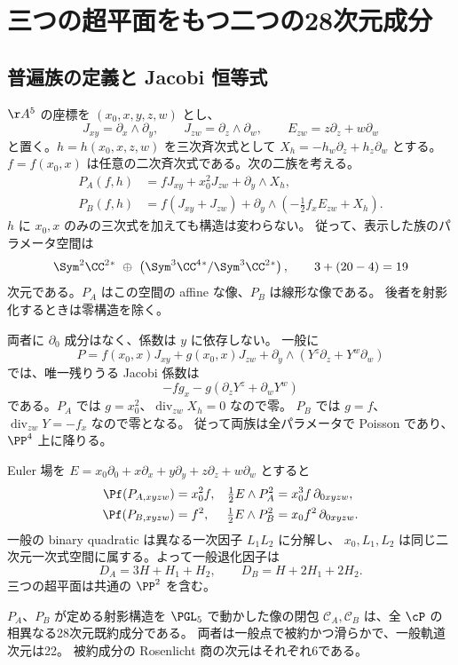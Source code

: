 \section{三つの超平面をもつ二つの28次元成分}\label{sec:ambient}
\subsection{普遍族の定義と Jacobi 恒等式}
$\AA^5$ の座標を $(x_0,x,y,z,w)$ とし、
\[
 J_{xy}=\partial_x\wedge\partial_y,\qquad
 J_{zw}=\partial_z\wedge\partial_w,\qquad
 E_{zw}=z\partial_z+w\partial_w
\]
と置く。$h=h(x_0,x,z,w)$ を三次斉次式として
$X_h=-h_w\partial_z+h_z\partial_w$ とする。
$f=f(x_0,x)$ は任意の二次斉次式である。次の二族を考える。
\begin{align}
 P_A(f,h)&=fJ_{xy}+x_0^2J_{zw}+\partial_y\wedge X_h,
 \label{eq:PA}\\
 P_B(f,h)&=f(J_{xy}+J_{zw})
       +\partial_y\wedge\left(-\frac12f_xE_{zw}+X_h\right).
 \label{eq:PB}
\end{align}
$h$ に $x_0,x$ のみの三次式を加えても構造は変わらない。
従って、表示した族のパラメータ空間は
\[
 \Sym^2\CC^2{}^*\ \oplus\
 \left(\Sym^3\CC^4{}^*/\Sym^3\CC^2{}^*\right),
 \qquad 3+(20-4)=19
\]
次元である。$P_A$ はこの空間の affine な像、$P_B$ は線形な像である。
後者を射影化するときは零構造を除く。

両者に $\partial_0$ 成分はなく、係数は $y$ に依存しない。
一般に
\[
 P=f(x_0,x)J_{xy}+g(x_0,x)J_{zw}
                 +\partial_y\wedge(Y^z\partial_z+Y^w\partial_w)
\]
では、唯一残りうる Jacobi 係数は
\[
             -f g_x-g(\partial_zY^z+\partial_wY^w)
\]
である。$P_A$ では $g=x_0^2$、$\operatorname{div}_{zw}X_h=0$ なので零。
$P_B$ では $g=f$、$\operatorname{div}_{zw}Y=-f_x$ なので零となる。
従って両族は全パラメータで Poisson であり、$\PP^4$ 上に降りる。

Euler 場を $E=x_0\partial_0+x\partial_x+y\partial_y+z\partial_z+w\partial_w$
とすると
\begin{align}
 \Pf(P_{A,xyzw})&=x_0^2f,&
 \tfrac12E\wedge P_A^2&=x_0^3f\,\partial_{0xyzw},\label{eq:DA}\\
 \Pf(P_{B,xyzw})&=f^2,&
 \tfrac12E\wedge P_B^2&=x_0f^2\,\partial_{0xyzw}.
 \label{eq:DB}
\end{align}
一般の binary quadratic は異なる一次因子 $L_1L_2$ に分解し、
$x_0,L_1,L_2$ は同じ二次元一次式空間に属する。よって一般退化因子は
\[
 D_A=3H+H_1+H_2,\qquad D_B=H+2H_1+2H_2.
\]
三つの超平面は共通の $\PP^2$ を含む。

\begin{theorem}\label{thm:AB}
$P_A$、$P_B$ が定める射影構造を $\PGL_5$ で動かした像の閉包
$\mathcal C_A,\mathcal C_B$ は、全 $\cP$ の相異なる28次元既約成分である。
両者は一般点で被約かつ滑らかで、一般軌道次元は22。
被約成分の Rosenlicht 商の次元はそれぞれ6である。
\end{theorem}

